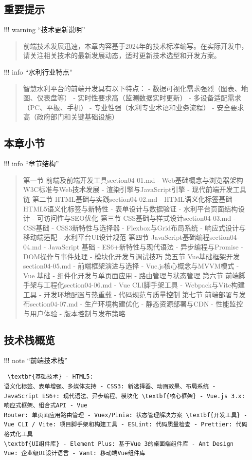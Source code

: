 \subsection{重要提示}\label{ux91cdux8981ux63d0ux793a} !!! warning ``技术更新说明'' \begin{quote}

前端技术发展迅速，本章内容基于2024年的技术标准编写。在实际开发中，请关注相关技术的最新发展动态，适时更新技术选型和开发方案。 
\end{quote} !!! info ``水利行业特点'' \begin{quote}

智慧水利平台的前端开发具有以下特点： - 数据可视化需求强烈（图表、地图、仪表盘等） - 实时性要求高（监测数据实时更新） - 多设备适配需求（PC、平板、手机） - 专业性强（水利专业术语和业务流程） -
安全要求高（政府部门和关键基础设施） 
\end{quote} \subsection{本章小节}\label{ux672cux7ae0ux5c0fux8282} !!! info ``章节结构'' \begin{quote}

第一节 前端及前端开发工具section04-01.md - Web基础概念与浏览器架构 - W3C标准与Web技术发展 - 渲染引擎与JavaScript引擎 - 现代前端开发工具链 第二节
HTML基础与实践section04-02.md - HTML语义化标签基础 - HTML5语义化标签与新特性 - 表单设计与数据验证 - 水利平台页面结构设计 - 可访问性与SEO优化 第三节
CSS基础与样式设计section04-03.md - CSS基础 - CSS3新特性与选择器 - Flexbox与Grid布局系统 - 响应式设计与移动端适配 - 水利平台UI设计规范 第四节
JavaScript基础编程section04-04.md - JavaScript 基础 - ES6+新特性与现代语法 - 异步编程与Promise - DOM操作与事件处理 - 模块化开发与调试技巧 第五节
Vue基础框架开发section04-05.md - 前端框架演进与选择 - Vue.js核心概念与MVVM模式 - Vue 基础 - 组件化开发与单页面应用 - 路由管理与状态管理 第六节
前端脚手架与工程化section04-06.md - Vue CLI脚手架工具 - Webpack与Vite构建工具 - 开发环境配置与热重载 - 代码规范与质量控制 第七节 前端部署与发布section04-07.md -
生产环境构建优化 - 静态资源部署与CDN - 性能监控与用户体验 - 版本控制与发布策略 
\end{quote} \keypoints{
}\subsection{技术栈概览}\label{ux6280ux672fux6808ux6982ux89c8} !!! note ``前端技术栈'' \begin{verbatim} \textbf{基础技术} - HTML5:
语义化标签、表单增强、多媒体支持 - CSS3: 新选择器、动画效果、布局系统 - JavaScript ES6+: 现代语法、异步编程、模块化 \textbf{核心框架} - Vue.js 3.x: 响应式框架、组合式API - Vue
Router: 单页面应用路由管理 - Vuex/Pinia: 状态管理解决方案 \textbf{开发工具} - Vue CLI / Vite: 项目脚手架和构建工具 - ESLint: 代码质量检查 - Prettier: 代码格式化工具
\textbf{UI组件库} - Element Plus: 基于Vue 3的桌面端组件库 - Ant Design Vue: 企业级UI设计语言 - Vant: 移动端Vue组件库 \end{verbatim}
